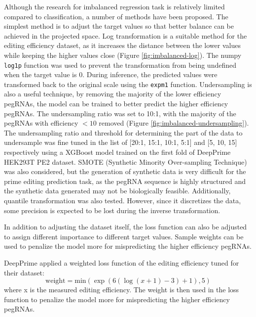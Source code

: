 Although the research for imbalanced regression task is relatively limited compared to classification, a number of methods have been proposed\cite{krawczykLearningImbalancedData2016}. The simplest method is to adjust the target values so that better balance can be achieved in the projected space. Log transformation is a suitable method for the editing efficiency dataset, as it increases the distance between the lower values while keeping the higher values close (Figure \ref{fig:imbalanced-log}). The numpy \verb|log1p| function was used to prevent the transformation from being undefined when the target value is 0. During inference, the predicted values were transformed back to the original scale using the \verb|expm1| function. Undersampling is also a useful technique, by removing the majority of the lower efficiency pegRNAs, the model can be trained to better predict the higher efficiency pegRNAs\cite{torgoResamplingStrategiesRegression2015}. 
The undersampling ratio was set to 10:1, with the majority of the pegRNAs with efficiency $<10$ removed (Figure \ref{fig:imbalanced-undersampling}). The undersampling ratio and threshold for determining the part of the data to undersample was fine tuned in the list of [20:1, 15:1, 10:1, 5:1] and [5, 10, 15] respectively using a XGBoost model trained on the first fold of DeepPrime HEK293T PE2 dataset. 
SMOTE (Synthetic Minority Over-sampling Technique) was also considered, but the generation of synthetic data is very difficult for the prime editing prediction task, as the pegRNA sequence is highly structured and the synthetic data generated may not be biologically feasible. Additionally, quantile transformation was also tested. However, since it discretizes the data, some precision is expected to be lost during the inverse transformation.

In addition to adjusting the dataset itself, the loss function can also be adjusted to assign different importance to different target values. Sample weights can be used to penalize the model more for mispredicting the higher efficiency pegRNAs. 


DeepPrime applied a weighted loss function of the editing efficiency tuned for their dataset:
\begin{equation}
    \text{weight} = \text{min}(\exp(6(\log(x+1)-3)+1),5)
\end{equation}
where x is the measured editing efficiency. The weight is then used in the loss function to penalize the model more for mispredicting the higher efficiency pegRNAs.

